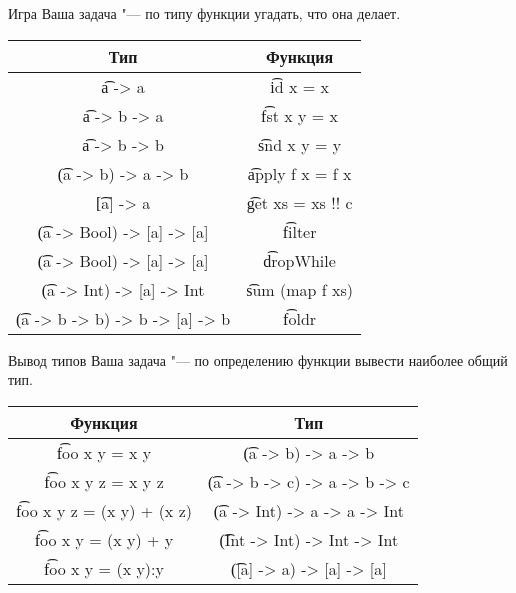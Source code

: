 \begin{frame}{Игра}
	Ваша задача "--- по типу функции угадать, что она делает.
	\begin{tabular}{c|c}
		\centering
		Тип & Функция \\\hline
		\t{a -> a} & \pause\t{id x = x} \\\pause
		\t{a -> b -> a} & \pause\t{fst x y = x} \\\pause
		\t{a -> b -> b} & \pause\t{snd x y = y} \\\pause
		\t{(a -> b) -> a -> b} & \pause\t{apply f x = f x} \\\pause
		\t{[a] -> a} & \pause\t{get xs = xs !! c} \\\pause
		\t{(a -> Bool) -> [a] -> [a]} & \pause\t{filter} \\\pause
		\t{(a -> Bool) -> [a] -> [a]} & \pause\t{dropWhile} \\\pause
		\t{(a -> Int) -> [a] -> Int} & \pause\t{sum (map f xs)} \\\pause
		\t{(a -> b -> b) -> b -> [a] -> b} & \pause\t{foldr}
	\end{tabular}
\end{frame}

\begin{frame}{Вывод типов}
	Ваша задача "--- по определению функции вывести наиболее общий тип.
	\begin{tabular}{c|c}
		\centering
		Функция & Тип \\\hline
		\t{foo x y = x y} & \pause \t{(a -> b) -> a -> b} \\\pause
		\t{foo x y z = x y z} & \pause \t{(a -> b -> c) -> a -> b -> c} \\\pause
		\t{foo x y z = (x y) + (x z)} & \pause \t{(a -> Int) -> a -> a -> Int} \\\pause
		\t{foo x y = (x y) + y} & \pause \t{(Int -> Int) -> Int -> Int} \\\pause
		\t{foo x y = (x y):y} & \pause \t{([a] -> a) -> [a] -> [a]} \\
	\end{tabular}
\end{frame}

